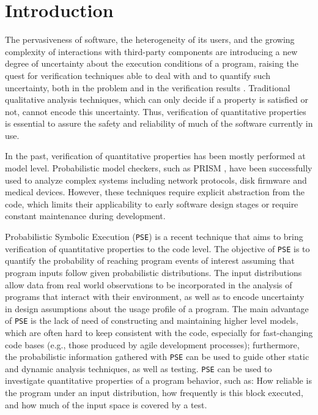 \documentclass[10pt]{article}
\newcounter{list}
\begin{document}
\newcommand{\PSE}{\texttt{PSE}}
\newcommand{\qCORAL}{\texttt{qCORAL}}
\newcommand{\PC}{\textit{PC}}
\raisebox{1cm}

\vspace{-20mm}
\section{Introduction}

The pervasiveness of software, the heterogeneity of its users, and the
growing complexity of interactions with third-party components are
introducing a new degree of uncertainty about the execution conditions
of a program, raising the quest for verification techniques able to
deal with and to quantify such uncertainty, both in the problem and in
the verification results \cite{borges2015iterative}. Traditional
qualitative analysis techniques, which can only decide if a property
is satisfied or not, cannot encode this uncertainty.  Thus,
verification of quantitative properties is essential to assure the
safety and reliability of much of the software currently in use.

In the past, verification of quantitative properties has been mostly
performed at model level. Probabilistic model checkers, such as PRISM
\cite{kwiatkowska2011prism}, have been successfully used to analyze
complex systems including network protocols, disk firmware and medical
devices.  However, these techniques require explicit abstraction from
the code, which limits their applicability to early software design
stages or require constant maintenance during development.

Probabilistic Symbolic Execution (\PSE{})
\cite{geldenhuys2012probabilistic,filieri2013reliability} is a recent
technique that aims to bring verification of quantitative properties
to the code level. The objective of \PSE{} is to quantify the
probability of reaching program events of interest assuming that
program inputs follow given probabilistic distributions. The input
distributions allow data from real world observations to be
incorporated in the analysis of programs that interact with their
environment, as well as to encode uncertainty in design assumptions
about the usage profile of a program. The main advantage of \PSE{} is
the lack of need of constructing and maintaining higher level models,
which are often hard to keep consistent with the code, especially for
fast-changing code bases (e.g., those produced by agile development
processes); furthermore, the probabilistic information gathered with
\PSE{} can be used to guide other static and dynamic analysis
techniques, as well as testing. \PSE{} can be used to investigate
quantitative properties of a program behavior, such as: How reliable
is the program under an input distribution, how frequently is this
block executed, and how much of the input space is covered by a test.
\end{document}
